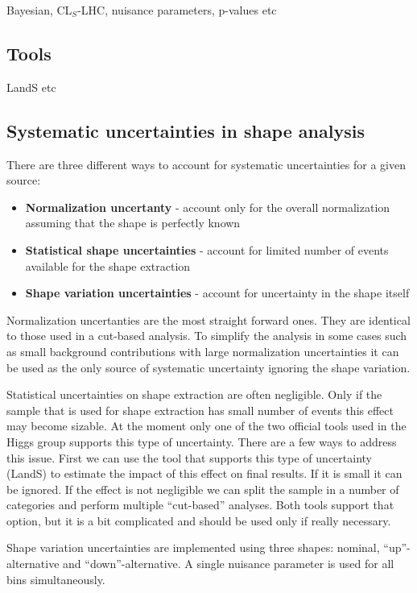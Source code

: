 Bayesian, CL$_S$-LHC, nuisance parameters, p-values etc 

\subsection{Tools}
LandS etc

\subsection{Systematic uncertainties in shape analysis} 

There are three different ways to account for systematic uncertainties for a given source:
\begin{itemize}
  \item {\bf Normalization uncertanty} - account only for the overall
    normalization assuming that the shape is perfectly known
  \item {\bf Statistical shape uncertainties} - account for limited
    number of events available for the shape extraction
  \item {\bf Shape variation uncertainties} - account for uncertainty
    in the shape itself
\end{itemize}

Normalization uncertanties are the most straight forward ones. They
are identical to those used in a cut-based analysis. To simplify the
analysis in some cases such as small background contributions with
large normalization uncertainties it can be used as the only source of
systematic uncertainty ignoring the shape variation.

Statistical uncertainties on shape extraction are often
negligible. Only if the sample that is used for shape extraction has
small number of events this effect may become sizable. At the moment
only one of the two official tools used in the Higgs group supports
this type of uncertainty. There are a few ways to address this
issue. First we can use the tool that supports this type of
uncertainty (LandS) to estimate the impact of this effect on final
results. If it is small it can be ignored. If the effect is not
negligible we can split the sample in a number of categories and
perform multiple ``cut-based'' analyses. Both tools support that
option, but it is a bit complicated and should be used only if really
necessary.

Shape variation uncertainties are implemented using three shapes:
nominal, ``up''-alternative and ``down''-alternative. A single
nuisance parameter is used for all bins simultaneously.
